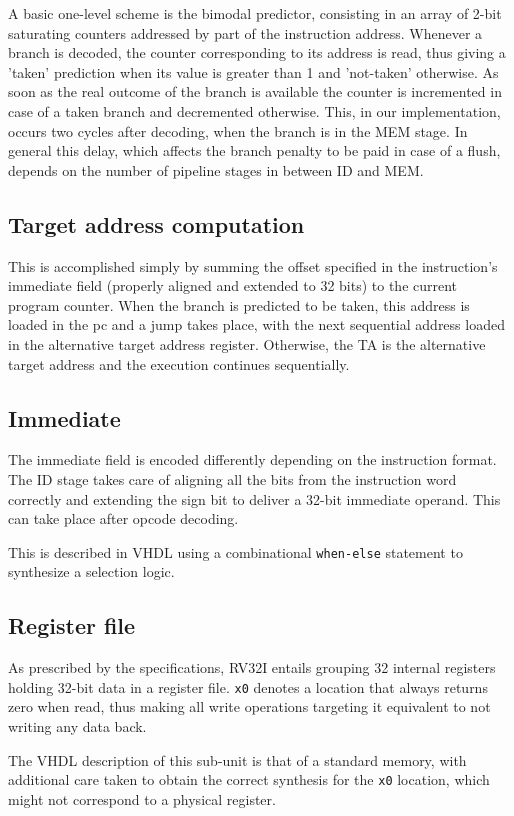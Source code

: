 A basic one-level scheme is the bimodal predictor, consisting in an array of 2-bit saturating counters addressed by part of the instruction address. Whenever a branch is decoded, the counter corresponding to its address is read, thus giving a 'taken' prediction when its value is greater than 1 and 'not-taken' otherwise. As soon as the real outcome of the branch is available the counter is incremented in case of a taken branch and decremented otherwise. This, in our implementation, occurs two cycles after decoding, when the branch is in the MEM stage. In general this delay, which affects the branch penalty to be paid in case of a flush, depends on the number of pipeline stages in between ID and MEM.


\subsection{Target address computation} This is accomplished simply by summing the offset specified in the instruction's immediate field (properly aligned and extended to 32 bits) to the current program counter. When the branch is predicted to be taken, this address is loaded in the pc and a jump takes place, with the next sequential address loaded in the alternative target address register. Otherwise, the TA is the alternative target address and the execution continues sequentially.

\subsection{Immediate} The immediate field is encoded differently depending on the instruction format. The ID stage takes care of aligning all the bits from the instruction word correctly and extending the sign bit to deliver a 32-bit immediate operand. This can take place after opcode decoding.

This is described in VHDL using a combinational \texttt{when-else} statement to synthesize a selection logic.

\subsection{Register file} As prescribed by the specifications, RV32I entails grouping 32 internal registers holding 32-bit data in a register file. \texttt{x0} denotes a location that always returns zero when read, thus making all write operations targeting it equivalent to not writing any data back.  

The VHDL description of this sub-unit is that of a standard memory, with additional care taken to obtain the correct synthesis for the \texttt{x0} location, which might not correspond to a physical register.